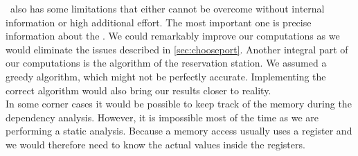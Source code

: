 \suaca\ also has some limitations that either cannot be overcome without internal information or high additional effort.
The most important one is precise information about the \microops. We could remarkably improve our computations as we would eliminate the issues described in \autoref{sec:chooseport}. Another integral part of our computations is the algorithm of the reservation station. We assumed a greedy algorithm, which might not be perfectly accurate. Implementing the correct algorithm would also bring our results closer to reality.\\
In some corner cases it would be possible to keep track of the memory during the dependency analysis. However, it is impossible most of the time as we are performing a static analysis. Because a memory access usually uses a register and we would therefore need to know the actual values inside the registers.\\


